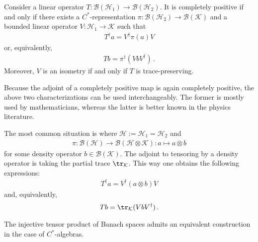     \begin{theorem}[Stinespring]\label{operators:stinespring}
        Consider a linear operator $T:\mathcal{B}(\mathcal{H}_1)\rightarrow\mathcal{B}(\mathcal{H}_2)$. It is completely positive if and only if there exists a $C^*$-representation $\pi:\mathcal{B}(\mathcal{H}_2)\rightarrow\mathcal{B}(\mathcal{K})$ and a bounded linear operator $V:\mathcal{H}_1\rightarrow\mathcal{K}$ such that
        \begin{gather}
            T^\dagger a = V^\dag\pi(a)V
        \end{gather}
        or, equivalently,
        \begin{gather}
            Tb = \pi^\dagger(VbV^\dagger)\,.
        \end{gather}
        Moreover, $V$ is an isometry if and only if $T$ is trace-preserving.
    \end{theorem}
    \begin{remark}
        Because the adjoint of a completely positive map is again completely positive, the above two characterizations can be used interchangeably. The former is mostly used by mathematicians, whereas the latter is better known in the physics literature.

        The most common situation is where $\mathcal{H}:=\mathcal{H}_1=\mathcal{H}_2$ and
        \begin{gather}
            \pi:\mathcal{B}(\mathcal{H})\rightarrow\mathcal{B}(\mathcal{H}\otimes\mathcal{K}):a\mapsto a\otimes b
        \end{gather}
        for some density operator $b\in\mathcal{B}(\mathcal{K})$. The adjoint to tensoring by a density operator is taking the partial trace $\tr_{\mathcal{K}}$. This way one obtains the following expressions:
        \begin{gather}
            T^\dagger a = V^\dag(a\otimes b)V
        \end{gather}
        and, equivalently,
        \begin{gather}
            Tb = \tr_{\mathcal{K}}(VbV^\dagger)\,.
        \end{gather}
    \end{remark}

    The injective tensor product of Banach spaces admits an equivalent construction in the case of $C^*$-algebras.


